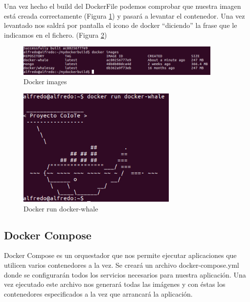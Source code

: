 Una vez hecho el build del DockerFile podemos comprobar que nuestra imagen está creada correctamente (Figura \ref{Imag:ImageWhale}) y pasará a levantar el contenedor. Una vez levantado nos saldrá por pantalla el icono de docker “diciendo” la frase que le indicamos en el fichero. (Figura \ref{Run:RunWhale}) 

\begin{figure}[htb]
\begin{center}
\includegraphics[width=0.90\textwidth]{./setup/DockerImagesWhale}
\caption{Docker images}
\label{Imag:ImageWhale}
\end{center}
\end{figure}
\pagebreak

\begin{figure}[htb]
\begin{center}
\includegraphics[width=0.70\textwidth]{./setup/DockerRunWhale}
\caption{Docker run docker-whale}
\label{Run:RunWhale}
\end{center}
\end{figure}

\subsection{Docker Compose}

Docker Compose es un orquestador que nos permite ejecutar aplicaciones que utilicen varios contenedores a la vez. Se creará un archivo docker-compose.yml donde se configurarán todos los servicios necesarios para nuestra aplicación. Una vez ejecutado este archivo nos generará todas las imágenes y con éstas los contenedores especificados a la vez que arrancará la aplicación.

